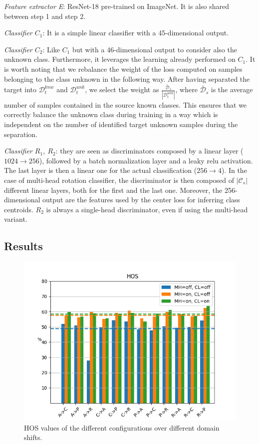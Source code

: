 \documentclass[10pt,twocolumn,letterpaper]{article}
\begin{document}
{\it Feature extractor E}: ResNet-18 pre-trained on ImageNet. It is also shared between step 1 and step 2.

{\it Classifier $C_1$}:
It is a simple linear classifier with a 45-dimensional output.

{\it Classifier $C_2$}:
Like $C_1$ but with a 46-dimensional output to consider also the unknown class. Furthermore, it leverages the learning already performed on $C_1$.
It is worth noting that we rebalance the weight of the loss computed on samples belonging to the class unknown in the following way.
After having separated the target into $\mathcal{D}_t^{knw}$ and $\mathcal{D}_t^{unk}$,
we select the weight as $\frac{\mathcal{\bar{D}}_s}{|\mathcal{D}_t^{unk}|}$,
where ${\mathcal{\bar{D}}_s}$ is the average number of samples contained in the source known classes.
This ensures that we correctly balance the unknown class during training in a way which is independent
on the number of identified target unknown samples during the separation.

{\it Classifier $R_1$, $R_2$}: 
they are seen as discriminators composed by a linear layer ($1024\to 256$),
followed by a batch normalization layer and a leaky relu activation.
The last layer is then a linear one for the actual classification ($256\to 4$).
In the case of multi-head rotation classifier,
the discriminator is then composed of $|\mathcal{C}_s|$ different linear layers, both for the first and the last one.
Moreover, the 256-dimensional output are the features used by the center loss for inferring class centroids.
$R_2$ is always a single-head discriminator, even if using the multi-head variant.

\subsection{Results}
\label{sec:results}

\begin{figure}[!t]
  \centering
  \includegraphics[trim= 0cm 0cm 0cm 0cm, clip, width=0.8\linewidth]{results_bars.png}
  \caption{\label{fig:results} HOS values of the different configurations over different domain shifts.}
\end{figure}
\end{document}
